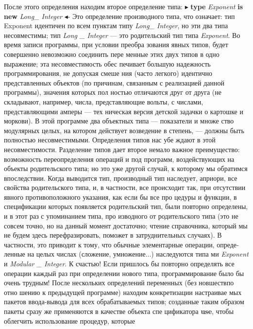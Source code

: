 \documentclass{mai_book}
\begin{document}
После этого определения находим второе определение типа: $\blacktriangleright$ {\bf type} {\it Ex­ponent } {\bf is new} {\it Long\_ Integer} $\blacktriangleleft$- Это определение производного типа, что
означает: тип Exponent идентичен по всем пунктам типу {\it Long\_ Integer},
но эти два типа несовместимы; тип {\it Long \_ Integer} — это родительский
тип типа {\it Exponent}. Во время записи программы, при условии преобра­
зования явных типов, будет совершенно невозможно соединить пере­
менные этих двух типов в одно выражение; эта несовместимость обес­
печивает большую надежность программирования, не допуская смеше­
ния (часто легкого) идентично представленных объектов (по причинам,
связанным с реализацией данной программы), значения которых пол­
ностью отличаются друг от друга (не складывают, например, числа,
представляющие вольты, с числами, представляющими амперы — тех­
ническая версия детской задачки о картошке и моркови).
В этой программе два объектных типа — показатели и множе­
ство модулярных целых, на котором действует возведение в степень, —
должны быть полностью несовместимыми. Определения типов нас убе­
ждают в этой несовместимости. Разделение типов дает второе немало­
важное преимущество: возможность переопределения операций и под­
программ, воздействующих на объекты родительского типа; но это уже
другой случай, к которому мы обратимся впоследствии.
Когда выводится тип, производный тип наследует, априори, все
свойства родительского типа, и, в частности, все происходит так, при
отсутствии явного противоположного указания, как если бы все про­
цедуры и функции, в спецификации которых появляется родительский
тип, были повторно определены, и в этот раз с упоминанием типа, про­
изводного от родительского типа (это не совсем точно, но на данный
момент достаточно; чтение справочника, который мы не будем здесь
перефразировать, поможет в затруднительных случаях). В частности,
это приводит к тому, что обычные элементарные операции, опреде­
ленные на целых числах (сложение, умножение...) наследуются типа­
ми {\it Exponent} и {\it Modular \_ Integer}. К счастью! Если пришлось бы повторно
определять все операции каждый раз при определении нового типа,
программирование было бы очень трудным!
После нескольких определений переменных (без новшествпо отно­
шению к предыдущей программе) находим конкретизации настраивае­
мых пакетов ввода-вывода для всех обрабатываемых типов; созданные
таким образом пакеты сразу же применяются в качестве объекта спе­
цификатора {\bf use}, чтобы облегчить использование процедур, которые

\newpage
\end{document}
